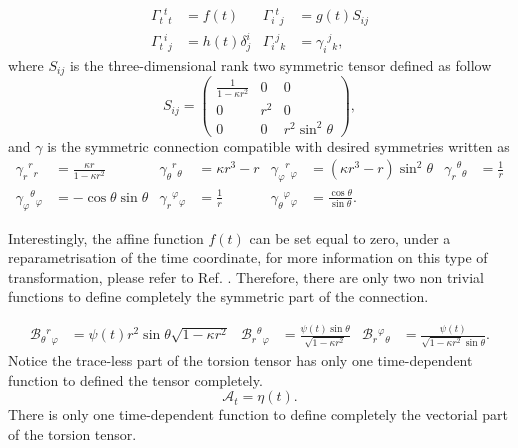 \documentclass{article}
\providecommand{\ctG}[3]{\Gamma_{#1}{}^{ #2}{}_{#3}}
\providecommand{\ctg}[3]{\gamma_{#1}{}^{ #2}{}_{#3}}
\providecommand{\B}[3]{\mathcal{B}_{#1}{}^{ #2}{}_{#3}}
\providecommand{\A}[1]{\mathcal{A}_{#1}}
\begin{document}
\begin{align}
    \label{G_ansatz}
    \ctG{t}{t}{t} & =f(t) & \ctG{i}{t}{j} & = g(t) S_{i j} \\
    \ctG{t}{i}{j} &= h(t) \delta^{i}_{j} & \ctG{i}{j}{k} & = \ctg{i}{j}{k},
\end{align}
where $S_{ij}$ is the three-dimensional rank two symmetric tensor defined as follow
\begin{equation}
    S_{i j}=\left(\begin{array}{ccc}
    \frac{1}{1-\kappa r^2} & 0 & 0 \\
    0 & r^2 & 0 \\
    0 & 0 & r^2 \sin ^2 \theta
    \end{array}\right),
\end{equation}
and $\gamma$ is the symmetric connection compatible with desired symmetries written as
\begin{align}
    \ctg{r}{r}{r} & = \frac{\kappa r}{1 - \kappa r^2} & \ctg{\theta}{r}{\theta} & = \kappa r^3 - r &
    \ctg{\varphi}{r}{\varphi} & = \left(\kappa r^3 - r\right)\sin^2\theta & \ctg{r}{\theta}{\theta} & = \frac{1}{r} \\
    \ctg{\varphi}{\theta}{\varphi} & = -\cos\theta\sin\theta & \ctg{r}{\varphi}{\varphi} & = \frac{1}{r} & 
    \ctg{\theta}{\varphi}{\varphi} & = \frac{\cos \theta}{\sin \theta}.
\end{align}

Interestingly, the affine function $f(t)$ can be set equal to zero, under a reparametrisation of the time coordinate, for more information
on this type of transformation, please refer to Ref. \cite{Castillo_Felisola_2022_EPJC}. Therefore, there are only two non trivial functions
to define completely the symmetric part of the connection.

\begin{equation}
\label{B_ansatz}
\begin{aligned}
    \B{\theta}{r}{\varphi} & = \psi (t) r^2\sin\theta \sqrt{1 - \kappa r^2} &
    \B{r}{\theta}{\varphi} & =\frac{\psi (t) \sin \theta}{\sqrt{1 - \kappa r^2}} & 
    \B{r}{\varphi}{\theta} & =\frac{\psi(t)}{ \sqrt{1-\kappa r^{2}} \sin \theta}.
\end{aligned}
\end{equation}
Notice the trace-less part of the torsion tensor has only one time-dependent function to defined the tensor completely.
\begin{equation}
    \label{A_ansatz}
    \A{t} = \eta(t).
\end{equation}
There is only one time-dependent function to define completely the vectorial part of the torsion tensor.
\end{document}
